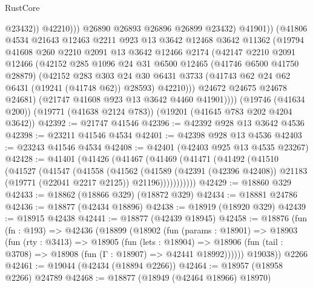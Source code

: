 \begin{lexlean}{RustCore}
\begin{coremodule}
                        @23432))
                    @42210)))
              @26890
              @26893
              @26896
              @26899
              @23432)
            @41901))
        (@41806
          @4534
          @21643
          @12463
          @2211
          @923
          @13
          @3642
          @12468
          @3642
          @11362
          (@19794
            @41608
            @260
            @2210
            @2091
            @13
            @3642
            @12466
            @2174
            (@42147
              @2210
              @2091
              @12466
              (@42152
                @285
                @1096
                @24
                @31
                @6500
                @12465
                (@41746 @6500 @41750 @28879)
                (@42152
                  @283
                  @303
                  @24
                  @30
                  @6431
                  @3733
                  (@41743 @62 @24 @62 @6431 (@19241 (@41748 @62)) @28593)
                  @42210)))
            @24672
            @24675
            @24678
            @24681)
          (@21747 @41608 @923 @13 @3642 @4460 @41901))))
    (@19746 (@41634 @200))
    (@19771 (@41638 @2124 @783))
    (@19201 (@41645 @783 @202 @4204 @3642))
@42392 := @21747 @41546
@42396 := @42392 @928 @13 @3642 @4536
@42398 := @23211 @41546 @4534
@42401 := @42398 @928 @13 @4536
@42403 := @23243 @41546 @4534
@42408 := @42401 (@42403 @925 @13 @4535 @23267)
@42428 := @41401
    (@41426
      (@41467
        (@41469
          (@41471
            (@41492
              (@41510
                (@41527
                  (@41547
                    (@41558
                      (@41562
                        (@41589
                          (@42391 (@42396 @42408))
                          @21183
                          (@19771 (@22041 @2217 @2125))
                          @21196)))))))))))
@42429 := @18860 @329
@42433 := @18862 (@18866 @329) (@18872 @329)
@42434 := @18881 @24786
@42436 := @18877 (@42434 @18896)
@42438 := @18919 (@18920 @329)
@42439 := @18915 @42438
@42441 := @18877 (@42439 @18945)
@42458 := @18876
    (fun (fn : @193) =>
    @42436
      (@18899
        (@18902
          (fun (params : @18901) =>
          @18903
            (fun (rty : @3413) =>
            @18905
              (fun (lets : @18904) =>
              @18906 (fun (tail : @3708) => @18908 (fun (Γ : @18907) => @42441 @18992))))))
        @19038))
    @2266
@42461 := @19044 (@42434 (@18894 @2266))
@42464 := @18957 (@18958 @2266) @24789
@42468 := @18877 (@18949 (@42464 @18966) @18970)

\end{coremodule}
\end{lexlean}
